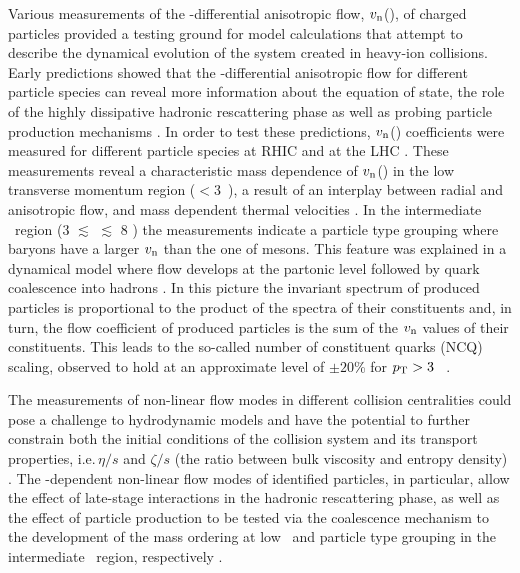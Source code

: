 Various measurements of the \pT-differential anisotropic flow, $v_{\rm n}$(\pT), of charged particles \cite{Voloshin:2008dg, ALICE:2011ab, ATLAS:2012at, Chatrchyan:2013kba, Acharya:2018lmh,Acharya:2018ihu} provided a testing ground for model calculations that attempt to describe the dynamical evolution of the system created in heavy-ion collisions. Early predictions showed that the \pT-differential anisotropic flow for different particle species can reveal more information about the equation of state, the role of the highly dissipative hadronic rescattering phase as well as probing particle production mechanisms \cite{Voloshin:1996nv,Huovinen:2001cy}. In order to test these predictions, $v_{\rm n}$(\pT) coefficients were measured for different particle species at RHIC \cite{Adams:2003am,Abelev:2007qg,Adler:2003kt,Adare:2006ti} and at the LHC \cite{Abelev:2014pua,Adam:2015eta,Adam:2016nfo,Acharya:2018zuq}. These measurements reveal a characteristic mass dependence of $v_{\rm n}$(\pT) in the low transverse momentum region (\pT$<3$~\GeVc), a result of an interplay between radial and anisotropic flow, and mass dependent thermal velocities \cite{Voloshin:1996nv,Huovinen:2001cy}.  
In the intermediate \pT~region (3 $\lesssim$ \pT $\lesssim$ 8 \GeVc) the measurements indicate a particle type grouping where baryons have a larger $v_{\rm n}$ than the one of mesons. This feature was explained in a dynamical model where flow develops at the partonic level followed by quark coalescence into hadrons \cite{Voloshin:2002wa,Molnar:2003ff}. In this picture the invariant spectrum of produced particles is proportional to the product of the spectra of their constituents and, in turn, the flow coefficient of produced particles is the sum of the $v_{\rm n}$ values of their constituents. This leads to the so-called number of constituent quarks (NCQ) scaling, observed to hold at an approximate level of $\pm20$\% for $p_{\rm{T}} > 3$ \GeV~\cite{Adare:2006ti,Adare:2012vq,Abelev:2014pua,Adam:2016nfo}.

The measurements of non-linear flow modes in different collision centralities could pose a challenge to hydrodynamic models and have the potential to further constrain both the initial conditions of the collision system and its transport properties, i.e.\,$\eta/s$ and $\zeta/s$ (the ratio between bulk viscosity and entropy density) \cite{Zhu:2016puf, Acharya:2017zfg}. The \pT-dependent non-linear flow modes of identified particles, in particular, allow the effect of late-stage interactions in the hadronic rescattering phase, as well as the effect of particle production to be tested via the coalescence mechanism to the development of the mass ordering at low \pT~and particle type grouping in the intermediate \pT~region, respectively \cite{ALICE:2011ab,Acharya:2018zuq}.

